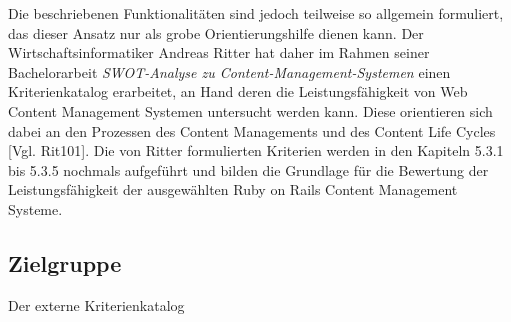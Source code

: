 Die beschriebenen Funktionalitäten sind jedoch teilweise so allgemein formuliert, das dieser Ansatz nur als grobe Orientierungshilfe dienen kann.
Der Wirtschaftsinformatiker Andreas Ritter hat daher im Rahmen seiner Bachelorarbeit \emph{SWOT-Analyse zu Content-Management-Systemen} einen Kriterienkatalog erarbeitet, an Hand deren die Leistungsfähigkeit von Web Content Management Systemen untersucht werden kann. Diese orientieren sich dabei an den Prozessen des Content Managements und des Content Life Cycles [Vgl. Rit101].
\newline
\newline
Die von Ritter formulierten Kriterien werden in den Kapiteln 5.3.1 bis 5.3.5 nochmals aufgeführt und bilden die Grundlage für die Bewertung der Leistungsfähigkeit der ausgewählten Ruby on Rails Content Management Systeme.



\subsection{Zielgruppe}
Der externe Kriterienkatalog



